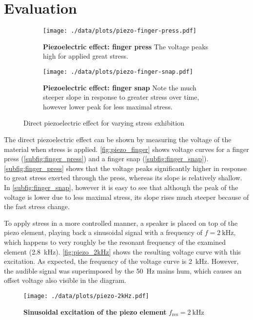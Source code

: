 \section{Evaluation}
\begin{figure}[tbp]
	\centering
	\begin{subfigure}{0.4\textwidth}
		\centering
		\texttt{[image: ./data/plots/piezo-finger-press.pdf]}
		\caption[Piezoelectric effect: finger press]{\textbf{Piezoelectric effect: finger press} The voltage peaks high for applied great stress.}
		\label{subfig:finger_press}
	\end{subfigure}\quad
	\begin{subfigure}{0.4\textwidth}
		\centering
		\texttt{[image: ./data/plots/piezo-finger-snap.pdf]}
		\caption[Piezoelectric effect: finger snap]{\textbf{Piezoelectric effect: finger snap} Note the much steeper slope in response to greater stress over time, however lower peak for less maximal stress.}
		\label{subfig:finger_snap}
	\end{subfigure}
	\caption{Direct piezoelectric effect for varying stress exhibition}
	\label{fig:piezo_finger}
\end{figure}
The direct piezoelectric effect can be shown by measuring the voltage of the material when stress is applied.
\autoref{fig:piezo_finger} shows voltage curves for a finger press (\autoref{subfig:finger_press}) and a finger snap (\autoref{subfig:finger_snap}).
\autoref{subfig:finger_press} shows that the voltage peaks significantly higher in response to great stress exerted through the press, whereas its slope is relatively shallow.
In \autoref{subfig:finger_snap}, however it is easy to see that although the peak of the voltage is lower due to less maximal stress, its slope rises much steeper because of the fast stress change.

To apply stress in a more controlled manner, a speaker is placed on top of the piezo element, playing back a sinusoidal signal with a frequency of $f=\SI{2}{\kilo\hertz}$, which happens to very roughly be the resonant frequency of the examined element (\SI{2.8}{\kilo\hertz}).
\autoref{fig:piezo_2kHz} shows the resulting voltage curve with this excitation.
As expected, the frequency of the voltage curve is \SI{2}{\kilo\hertz}.
However, the audible signal was superimposed by the \SI{50}{\hertz} mains hum, which causes an offset voltage also visible in the diagram.
\begin{figure}[tbp]
	\centering
	\texttt{[image: ./data/plots/piezo-2kHz.pdf]}
	\caption[Sinusoidal excitation of the piezo element]{\textbf{Sinusoidal excitation of the piezo element} $f_\text{res}=\SI{2}{\kilo\hertz}$}
	\label{fig:piezo_2kHz}
\end{figure}
